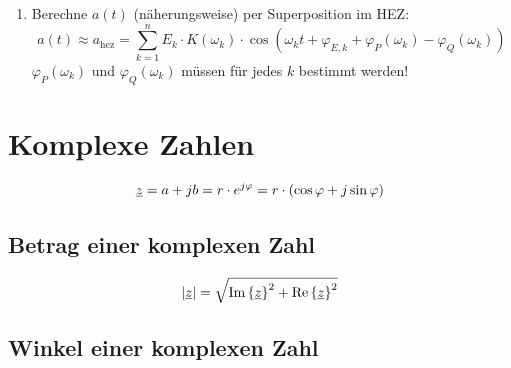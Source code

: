 \begin{enumerate}
  \item Berechne $a(t)$ (näherungsweise) per Superposition im HEZ:
    \[a(t) \approx a_{\text{hez}}
      = \sum_{k=1}^{n}
        E_k\cdot K(\omega_k)\cdot\cos(
          \omega_k t+\varphi_{E,k}+\varphi_P(\omega_k)-\varphi_Q(\omega_k))\]
    $\varphi_P(\omega_k)$ und $\varphi_Q(\omega_k)$ müssen für jedes $k$
    bestimmt werden!
\end{enumerate}




\section{Komplexe Zahlen}

\begin{align*}
  \underline{z} = a+jb = r\cdot e^{j\varphi} = r\cdot (\cos\varphi + j\sin\varphi)
\end{align*}


\subsection{Betrag einer komplexen Zahl}

\[|\underline{z}| = \sqrt{\operatorname{Im}\left\{\underline{z}\right\}^2+\operatorname{Re}\left\{\underline{z}\right\}^2}\]

\subsection{Winkel einer komplexen Zahl}\hfill

